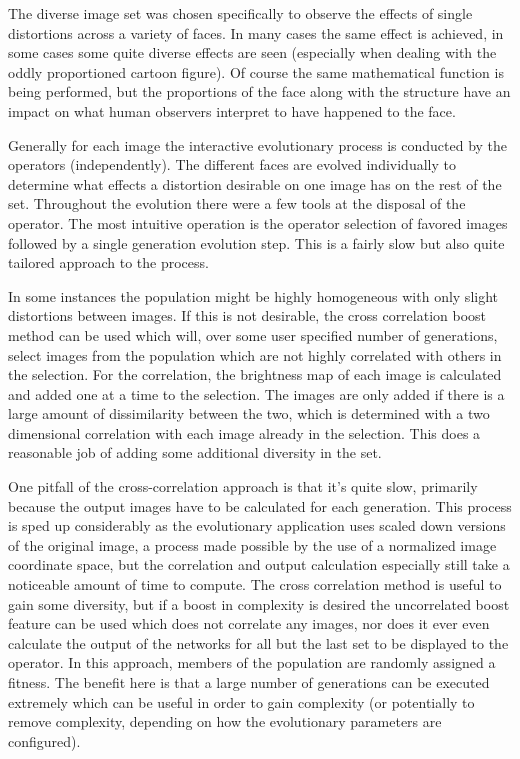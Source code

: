 The diverse image set was chosen specifically to observe the effects of single distortions across a variety of faces. In many cases the same effect is achieved, in some cases some quite diverse effects are seen (especially when dealing with the oddly proportioned cartoon figure). Of course the same mathematical function is being performed, but the proportions of the face along with the structure have an impact on what human observers interpret to have happened to the face.

Generally for each image the interactive evolutionary process is conducted by the operators (independently). The different faces are evolved individually to determine what effects a distortion desirable on one image has on the rest of the set. Throughout the evolution there were a few tools at the disposal of the operator. The most intuitive operation is the operator selection of favored images followed by a single generation evolution step. This is a fairly slow but also quite tailored approach to the process.

In some instances the population might be highly homogeneous with only slight distortions between images. If this is not desirable, the cross correlation boost method can be used which will, over some user specified number of generations, select images from the population which are not highly correlated with others in the selection. For the correlation, the brightness map of each image is calculated and added one at a time to the selection. The images are only added if there is a large amount of dissimilarity between the two, which is determined with a two dimensional correlation with each image already in the selection. This does a reasonable job of adding some additional diversity in the set.

One pitfall of the cross-correlation approach is that it's quite slow, primarily because the output images have to be calculated for each generation. This process is sped up considerably as the evolutionary application uses scaled down versions of the original image, a process made possible by the use of a normalized image coordinate space, but the correlation and output calculation especially still take a noticeable amount of time to compute. The cross correlation method is useful to gain some diversity, but if a boost in complexity is desired the uncorrelated boost feature can be used which does not correlate any images, nor does it ever even calculate the output of the networks for all but the last set to be displayed to the operator. In this approach, members of the population are randomly assigned a fitness. The benefit here is that a large number of generations can be executed extremely which can be useful in order to gain complexity (or potentially to remove complexity, depending on how the evolutionary parameters are configured).

